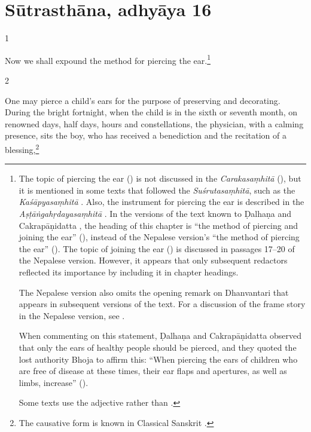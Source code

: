 
\section{Sūtrasthāna, adhyāya 16}
\renewcommand{\se}[2]{#2 (\dev{#1})} %
\newcommand{\seEngOnly}[2]{#2} %

\begin{translation}    
  
\item [1] 

Now we shall expound the method for piercing the ear.\footnote{The topic of 
    \se{kaṛnavyadha}{piercing the ear} is not discussed in the \emph{Carakasaṃhitā}
    (\cite[IB, 326, n.\,175]{meul-hist}), but it is mentioned in some texts that
    followed the \emph{Suśrutasaṃhitā}, such as the \emph{Kaśāpyasaṃhitā} \citep[IIA,
    30]{meul-hist}. Also, the instrument for piercing the ear is described in the
    \emph{Aṣṭāṅgahṛdayasaṃhitā} . In the versions of the text known
    to Ḍalhaṇa \citep[76]{vulgate} and Cakrapāṇidatta \citep[125]{acar-1939}, the
    heading of this chapter is “the method of piercing and joining the ear”
    (), instead of the Nepalese version's “the method of
    piercing the ear” (). The topic of joining the ear
    () is discussed in passages 17--20 of the Nepalese version.
    However, it appears that only subsequent redactors reflected its importance by
    including it in chapter headings.

 The Nepalese version also omits the opening remark on Dhanvantari that appears in
subsequent versions of the text. For a discussion of the frame story in the
Nepalese version, see \cite{birc-2021}. 

When commenting on this statement, Ḍalhaṇa \citep[76]{vulgate} and
Cakrapāṇidatta \citep[125]{acar-1939} observed that only the ears of healthy
people should be pierced, and they quoted the lost authority Bhoja to affirm
this: “When piercing the ears of children who are free of disease at these
times, their ear flaps and apertures, as well as limbs, increase” ().

Some texts use the adjective  rather than .}

\item [2] 

One may pierce a child's ears for the purpose of preserving and decorating. During the
bright fortnight, when the child is in the sixth or seventh month, on renowned
days, half days, hours and constellations, the physician, with a calming presence,
sits the boy, who has received a benediction and the recitation of a
blessing,\footnote{The causative form  is known in Classical
    Sanskrit \citep[166]{whit-root}.

}
\end{translation}
